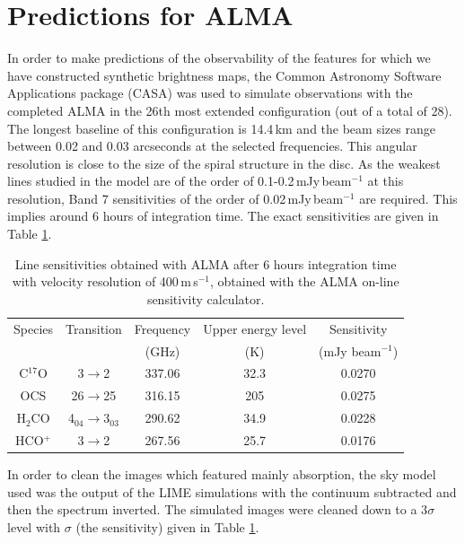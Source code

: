 \documentclass[useAMS,usenatbib]{mn2e}
\begin{document}
\section{Predictions for ALMA} \label{sec:alma_predictions}

In order to make predictions of the observability of the features for which we have constructed synthetic brightness maps, the Common Astronomy Software Applications package (CASA) was used to simulate observations with the completed ALMA in the 26th most extended configuration (out of a total of 28). The longest baseline of this configuration is 14.4\,km and the beam sizes range between 0.02 and 0.03 arcseconds at the selected frequencies. This angular resolution is close to the size of the spiral structure in the disc. As the weakest lines studied in the model are of the order of 0.1-0.2$\,$mJy$\,$beam$^{-1}$ at this resolution, Band 7 sensitivities of the order of 0.02$\,$mJy$\,$beam$^{-1}$ are required. This implies around 6 hours of integration time. The exact sensitivities are given in Table \ref{sigmas}.
\begin{table}
  \centering
  \begin{minipage}{90mm}
    \caption{Line sensitivities obtained with ALMA after 6 hours integration time with velocity resolution of 400$\,$m\,s$^{-1}$, obtained with the ALMA on-line sensitivity calculator.}
    \label{sigmas}
    \begin{tabular}{c||c|c|c|c}
      \hline
      Species & Transition & Frequency & Upper energy level & Sensitivity\\
              &            &   (GHz)   &       (K)          & (mJy beam$^{-1}$) \\
      \hline
      C$^{17}$O & 3$\rightarrow$2 & 337.06 & 32.3 & 0.0270 \\
      OCS & 26$\rightarrow$25 & 316.15 & 205 & 0.0275 \\
      H$_2$CO & 4$_{04}\rightarrow$3$_{03}$ &  290.62 & 34.9 & 0.0228 \\
      HCO$^+$ & 3$\rightarrow$2 & 267.56 & 25.7 & 0.0176 \\
      \hline
    \end{tabular}
  \end{minipage}
\end{table}
In order to clean the images which featured mainly absorption, the sky model used was the output of the LIME simulations with the continuum subtracted and then the spectrum inverted. The simulated images were cleaned down to a 3$\sigma$ level with $\sigma$ (the sensitivity) given in Table \ref{sigmas}.\smallskip
\end{document}
